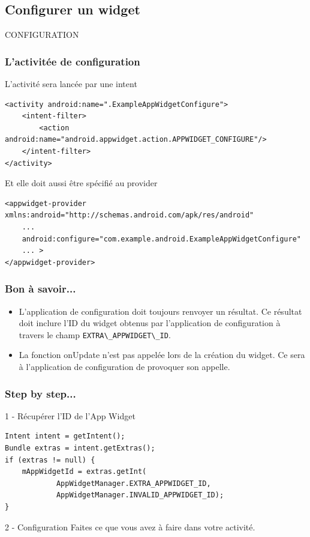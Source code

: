 \documentclass{beamer}
\begin{document}
\subsection{Configurer un widget}
\begin{frame}
CONFIGURATION
\end{frame}

\begin{frame}[fragile]
\frametitle{L'activitée de configuration}
\begin{block}{L'activité sera lancée par une intent}
\lstset{language=xml}
\begin{lstlisting}
<activity android:name=".ExampleAppWidgetConfigure">
    <intent-filter>
        <action android:name="android.appwidget.action.APPWIDGET_CONFIGURE"/>
    </intent-filter>
</activity>
\end{lstlisting}
\end{block}
\begin{block}{Et elle doit aussi être spécifié au provider}
\begin{lstlisting}
<appwidget-provider xmlns:android="http://schemas.android.com/apk/res/android"
    ...
    android:configure="com.example.android.ExampleAppWidgetConfigure" 
    ... >
</appwidget-provider>
\end{lstlisting}
\end{block}
\end{frame}

\begin{frame}
\frametitle{Bon à savoir...}
\begin{itemize}
\item L'application de configuration doit toujours renvoyer un résultat. Ce résultat doit inclure l'ID du widget obtenus par l'application de configuration à travers le champ \verb!EXTRA\_APPWIDGET\_ID!.
\item La fonction onUpdate n'est pas appelée lors de la création du widget. Ce sera à l'application de configuration de provoquer son appelle.
\end{itemize}

\end{frame}

\begin{frame}[fragile]
\frametitle{Step by step...}

\begin{block}{1 - Récupérer l'ID de l'App Widget}
\begin{lstlisting}
Intent intent = getIntent();
Bundle extras = intent.getExtras();
if (extras != null) {
    mAppWidgetId = extras.getInt(
            AppWidgetManager.EXTRA_APPWIDGET_ID, 
            AppWidgetManager.INVALID_APPWIDGET_ID);
}
\end{lstlisting}
\end{block}

\begin{block}{2 - Configuration}
Faites ce que vous avez à faire dans votre activité.
\end{block}
\end{frame}
\end{document}

